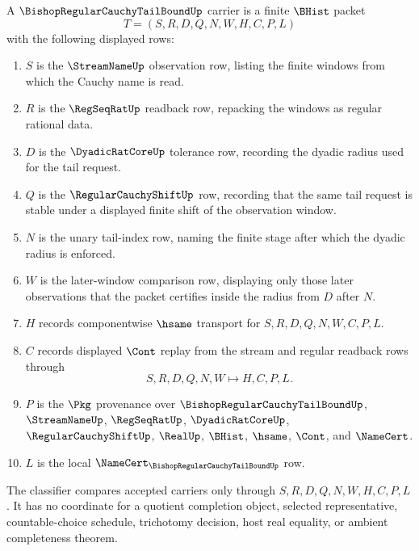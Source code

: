 \begin{definition}
\label{def:bishop-regular-cauchy-tail-bound-carrier}
A $\BishopRegularCauchyTailBoundUp$ carrier is a finite $\BHist$ packet
$$
T=(S,R,D,Q,N,W,H,C,P,L)
$$
with the following displayed rows:
\begin{enumerate}
\item $S$ is the $\StreamNameUp$ observation row, listing the finite windows from which the Cauchy name is read.
\item $R$ is the $\RegSeqRatUp$ readback row, repacking the windows as regular rational data.
\item $D$ is the $\DyadicRatCoreUp$ tolerance row, recording the dyadic radius used for the tail request.
\item $Q$ is the $\RegularCauchyShiftUp$ row, recording that the same tail request is stable under a displayed finite shift of the observation window.
\item $N$ is the unary tail-index row, naming the finite stage after which the dyadic radius is enforced.
\item $W$ is the later-window comparison row, displaying only those later observations that the packet certifies inside the radius from $D$ after $N$.
\item $H$ records componentwise $\hsame$ transport for $S,R,D,Q,N,W,C,P,L$.
\item $C$ records displayed $\Cont$ replay from the stream and regular readback rows through
$$
S,R,D,Q,N,W \longmapsto H,C,P,L .
$$
\item $P$ is the $\Pkg$ provenance over $\BishopRegularCauchyTailBoundUp$, $\StreamNameUp$, $\RegSeqRatUp$, $\DyadicRatCoreUp$, $\RegularCauchyShiftUp$, $\RealUp$, $\BHist$, $\hsame$, $\Cont$, and $\NameCert$.
\item $L$ is the local $\NameCert_{\BishopRegularCauchyTailBoundUp}$ row.
\end{enumerate}
The classifier compares accepted carriers only through $S,R,D,Q,N,W,H,C,P,L$. It has no coordinate for a quotient completion object, selected representative, countable-choice schedule, trichotomy decision, host real equality, or ambient completeness theorem.
\end{definition}

